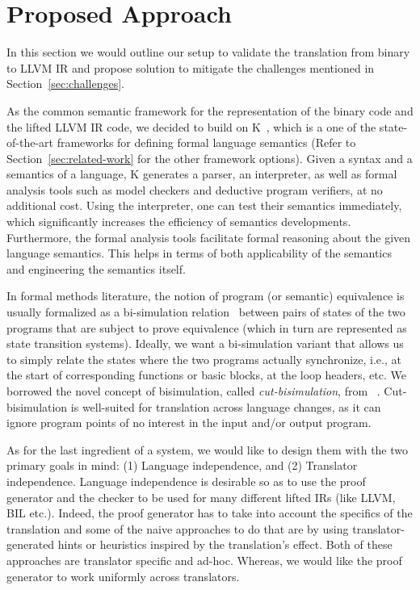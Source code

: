 \section{Proposed Approach}\label{sec:approach} In this section we would
outline our setup to validate the translation from binary to LLVM IR and
propose solution to mitigate the challenges mentioned in
Section~\ref{sec:challenges}. 


As the common semantic framework for the representation of the binary code and
the lifted LLVM IR code, we decided to build on K~\cite{k-primer-2013-v32},
    which is a one of the state-of-the-art frameworks for defining formal
    language semantics (Refer to Section~\ref{sec:related-work} for the other
        framework options). Given a syntax and a semantics of a language, K
        generates a parser, an interpreter, as well as formal analysis tools
        such as model checkers and deductive program verifiers, at no
        additional cost. Using the interpreter, one can test their semantics
        immediately, which significantly increases the efficiency of semantics
        developments. Furthermore, the formal analysis tools facilitate formal
        reasoning about the given language semantics. This helps in terms of
        both applicability of the semantics and engineering the semantics
        itself.
    
In formal methods literature, the notion of program (or semantic) equivalence
is usually formalized as a bi-simulation relation~\cite{Sangiorgi:2011} between
pairs of states of the two programs that are subject to prove equivalence
(which in turn are represented as state transition systems). Ideally, we want a
bi-simulation variant that allows us to simply relate the states where the two
programs actually synchronize, i.e., at the start of corresponding functions or
basic blocks, at the loop headers, etc. We borrowed the novel concept of 
bisimulation, called \emph{cut-bisimulation}, from ~\cite{}.
Cut-bisimulation is well-suited for translation  across language changes, as it
can ignore program points of no interest in the input and/or output
program.

As for the last ingredient of a \TV system, we would like to design them with
the two primary goals in mind: (1) Language independence, and (2) Translator
independence. Language independence is desirable so as to use the proof
generator and the checker to be used for   many different lifted IRs (like
    LLVM, BIL etc.). Indeed, the proof generator has to take into account the specifics
of the translation and some of the naive approaches to do that are by using
translator-generated hints or heuristics inspired by the translation's effect.
Both of these approaches  are translator specific and ad-hoc. Whereas, we would
like the proof generator to work uniformly across translators.   
 
